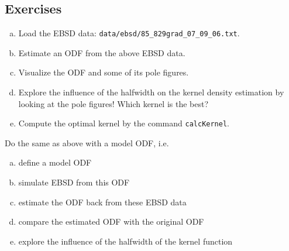 \subsection*{Exercises}

\begin{frame}

  \begin{Exercise}
    \begin{enumerate}[a)]
      \item Load the EBSD data:
      \texttt{data/ebsd/85\_829grad\_07\_09\_06.txt}.
      \item Estimate an ODF from the above EBSD data.
      \item Visualize the ODF and some of its pole figures.
      \item Explore the influence of the halfwidth on the kernel
      density estimation by looking at the pole figures! Which kernel is the best?
      \item Compute the optimal kernel by the command \texttt{calcKernel}.
    \end{enumerate}
  \end{Exercise}

    \begin{Exercise}
      Do the same as above with a model ODF, i.e.
    \begin{enumerate}[a)]
      \item define a model ODF
      \item simulate EBSD from this ODF
      \item estimate the ODF back from these EBSD data
      \item compare the estimated ODF with the original ODF
      \item explore the influence of the halfwidth of the kernel function
    \end{enumerate}
  \end{Exercise}

\end{frame}

